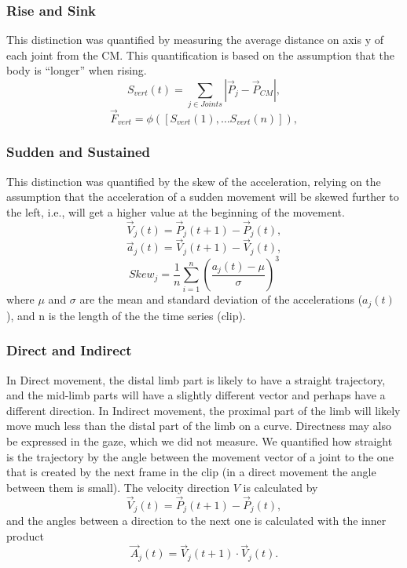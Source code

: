 \documentclass{sigchi}
\begin{document}
\subsubsection{Rise and Sink}
This distinction was quantified by measuring the average distance on 
axis y of each joint from the CM. This quantification is based on the 
assumption that the body is ``longer'' when rising.
\begin{equation*}
S_{vert}(t) = \sum_{j \in Joints}\left|\vec{P}_{j}-\vec{P}_{CM}\right|,
\end{equation*}
\begin{equation*}
\vec{F}_{vert} = \phi([S_{vert}(1), \ldots S_{vert}(n)]),
\end{equation*}

\subsubsection{Sudden and Sustained}
This distinction was quantified by the skew of the acceleration, relying on the assumption that the acceleration of a sudden movement will be skewed further to the left, i.e., will get a higher value at the beginning of the movement.
\begin{equation*}
\vec{V}_{j}(t) = \vec{P}_{j}(t+1) - \vec{P}_{j}(t),
\end{equation*}
\begin{equation*}
\vec{a}_j(t) = \vec{V}_{j}(t+1) - \vec{V}_{j}(t),
\end{equation*}
\begin{equation*}
Skew_j = \frac{1}{n}\sum_{i=1}^{n}(\frac{a_j(t) - \mu}{\sigma})^3
\end{equation*}
where $\mu$ and $\sigma$ are the mean and standard deviation of the accelerations ($a_j(t)$), and n is the length of the the time series (clip).
\subsubsection{Direct and Indirect}
In Direct movement, the distal limb part is likely to have a straight trajectory, and the mid-limb parts will have a slightly different vector and perhaps have a different direction.  In Indirect movement, the proximal part of the limb will likely move much less than the distal part of the limb on a curve.   Directness may also be expressed in the gaze, which we did not measure. We quantified how straight is the trajectory by the angle between the movement vector of a joint to the one that is created by the next frame in the clip (in a direct movement the angle between them is small).
The velocity direction $V$ is calculated by
\begin{equation*}
\vec{V}_{j}(t) = \vec{P}_{j}(t+1) - \vec{P}_{j}(t),
\end{equation*}
and the angles between a direction to the next one is calculated with the inner product
\begin{equation*}
\vec{A}_{j}(t) = \vec{V}_{j}(t+1) \cdot \vec{V}_{j}(t).
\end{equation*}
\end{document}
